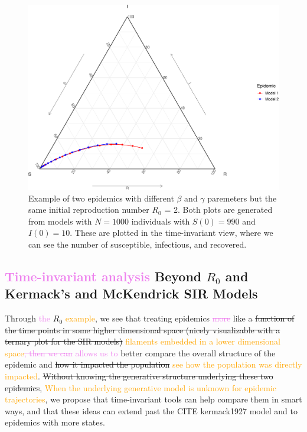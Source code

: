 \documentclass[
  shortnames]{jss}
\begin{document}
\begin{CodeChunk}
\begin{figure}[H]

{\centering \includegraphics{Figs/unnamed-chunk-3-1} 

}

\caption{\label{fig:different-scales-tern}Example of two epidemics with different $\beta$ and $\gamma$ paremeters but the same initial reproduction number $R_0$ = 2.  Both plots are generated from models with $N= 1000$ individuals with $S(0) = 990$ and $I(0) = 10$.  These are plotted in the time-invariant view, where we can see the number of susceptible, infectious, and recovered.}\label{fig:unnamed-chunk-3}
\end{figure}
\end{CodeChunk}

\subsection[Beyond R0 and SIR]{\textcolor{violet}{Time-invariant analysis}
Beyond \(R_0\) and Kermack's and McKendrick SIR
Models}\label{beyond-r0-sir}

Through \textcolor{violet}{the} \(R_0\) \textcolor{orange}{example}, we
see that treating epidemics \textcolor{violet}{\sout{more}} like a
\sout{function of the time points in some higher dimensional space (nicely visualizable with a ternary plot for the SIR models)}
\textcolor{orange}{filaments embedded in a lower dimensional space}\textcolor{violet}{\sout{, then we can} allows us to}
better compare the overall structure of the epidemic and
\sout{how it impacted the population}
\textcolor{orange}{see how the population was directly impacted}.
\sout{Without knowing the generative structure underlying these two epidemics},
\textcolor{orange}{When the underlying generative model is unknown for epidemic trajectories},
we propose that time-invariant tools can help compare them in smart
ways, and that these ideas can extend past the CITE kermack1927 model
and to epidemics with more states.
\end{document}

